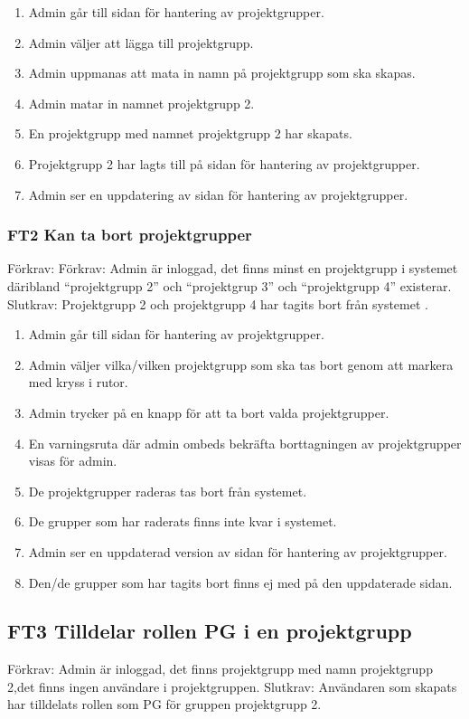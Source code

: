 \documentclass[paper=a4, fontsize=11pt,twoside]{article}
\begin{document}
\begin{enumerate}
	\item Admin går till sidan för hantering av projektgrupper.
	\item Admin väljer att lägga till projektgrupp.
	\item Admin uppmanas att mata in namn på projektgrupp som ska skapas.
	\item Admin matar in namnet projektgrupp 2.
	\item En projektgrupp med namnet projektgrupp 2 har skapats.
	\item Projektgrupp 2 har lagts till på sidan för hantering av projektgrupper.
	\item Admin ser en uppdatering av sidan för hantering av projektgrupper.
\end{enumerate}

\subsubsection*{FT2 Kan ta bort projektgrupper}
Förkrav: Förkrav: Admin är inloggad, det finns minst en projektgrupp i systemet däribland “projektgrupp 2” och “projektgrup 3” och “projektgrupp 4” existerar.
\newline
Slutkrav:  Projektgrupp 2 och projektgrupp 4 har tagits bort från systemet
.
\begin{enumerate}
	\item Admin går till sidan för hantering av projektgrupper.
	\item Admin väljer vilka/vilken projektgrupp som ska tas bort genom att markera med kryss i rutor.
	\item Admin trycker på en knapp för att ta bort valda projektgrupper.
	\item En varningsruta där admin ombeds bekräfta borttagningen av projektgrupper
	visas för admin.
	\item De projektgrupper raderas tas bort från systemet.
	\item De grupper som har raderats finns inte kvar i systemet.
	\item Admin ser en uppdaterad version av sidan för hantering av projektgrupper.
	\item Den/de grupper som har tagits bort finns ej med på den uppdaterade sidan.
\end{enumerate}

\subsection*{FT3 Tilldelar rollen PG i en projektgrupp}
	Förkrav: Admin är inloggad, det finns projektgrupp med namn projektgrupp 2,det
	finns ingen användare i projektgruppen.
	\newline
	Slutkrav:  Användaren som skapats har tilldelats rollen som PG för gruppen
	projektgrupp 2.
	
\end{document}
